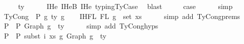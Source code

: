 \begin{isabellebody}
\ \ \ \ {\isacharcolon}{\kern0pt}\ ty{}{\isacharprime}{\kern0pt}{\isachardoublequoteclose}\isanewline
\ \ \ \ \isamarkupfalse%
\ IHe{}\ IHe{}B\ IHe{}\ typing{\isachardot}{\kern0pt}TyCase\ \isamarkupfalse%
\ blast\isanewline
\ \ \isamarkupfalse%
\ \isamarkupfalse%
\ {\isacharquery}{\kern0pt}case\isanewline
\ \ \ \ \isamarkupfalse%
\ simp\isanewline
{}\isamarkupfalse%
\isanewline
\ \ \isamarkupfalse%
\ {\isacharparenleft}{\kern0pt}TyCong\ {\isasymGamma}{\isacharprime}{\kern0pt}\ P\ g{}{\isacharprime}{\kern0pt}\ ty{\isacharprime}{\kern0pt}\ g{}{\isacharprime}{\kern0pt}{\isacharparenright}{\kern0pt}\isanewline
\isanewline
\ \ \isamarkupfalse%
\ IHFL{}{\isacharcolon}{\kern0pt}\ {\isachardoublequoteopen}FL\ g{}\ {\isacharequal}{\kern0pt}\ set\ xs{\isachardoublequoteclose}\isanewline
\ \ \ \ \isamarkupfalse%
\ {\isacharparenleft}{\kern0pt}simp\ add{\isacharcolon}{\kern0pt}\ TyCong{\isachardot}{\kern0pt}prems{\isacharparenleft}{\kern0pt}{}{\isacharparenright}{\kern0pt}{\isacharparenright}{\kern0pt}\isanewline
\isanewline
\ \ \isamarkupfalse%
\ P{}{\isacharcolon}{\kern0pt}\ {\isachardoublequoteopen}{\isasymGamma}{\isacharprime}{\kern0pt}\ {\isasymturnstile}{\isacharbraceleft}{\kern0pt}P{\isacharbraceright}{\kern0pt}\ {\isacharparenleft}{\kern0pt}Graph\ g{}{\isacharprime}{\kern0pt}{\isacharparenright}{\kern0pt}\ {\isacharcolon}{\kern0pt}\ ty{\isacharprime}{\kern0pt}{\isachardoublequoteclose}\isanewline
\ \ \ \ \isamarkupfalse%
\ {\isacharparenleft}{\kern0pt}simp\ add{\isacharcolon}{\kern0pt}\ TyCong{\isachardot}{\kern0pt}hyps{\isacharparenleft}{\kern0pt}{}{\isacharparenright}{\kern0pt}{\isacharparenright}{\kern0pt}\isanewline
\ \ \isamarkupfalse%
\ P{}{\isacharcolon}{\kern0pt}\ {\isachardoublequoteopen}{\isasymGamma}{}\ {\isasymturnstile}{\isacharbraceleft}{\kern0pt}P{\isacharbraceright}{\kern0pt}\ {\isacharparenleft}{\kern0pt}subst\ i\ xs\ g{}\ {\isacharparenleft}{\kern0pt}{\isacharparenleft}{\kern0pt}Graph\ g{}{\isacharprime}{\kern0pt}{\isacharparenright}{\kern0pt}{\isacharparenright}{\kern0pt}{\isacharparenright}{\kern0pt}\ {\isacharcolon}{\kern0pt}\ ty{\isacharprime}{\kern0pt}{\isachardoublequoteclose}\isanewline
\ \ \ \ \isamarkupfalse%

\end{isabellebody}
